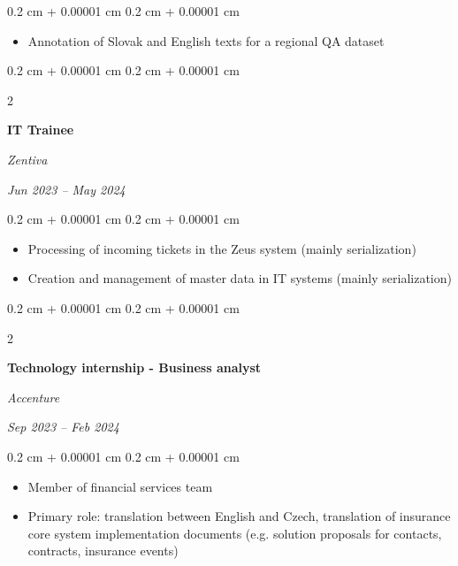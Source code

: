 \documentclass[10pt, letterpaper]{article}
\newenvironment{highlights}{
    \begin{itemize}[
        topsep=0.10 cm,
        parsep=0.10 cm,
        partopsep=0pt,
        itemsep=0pt,
        leftmargin=0.4 cm + 10pt
    ]
}{
    \end{itemize}
} %
\newenvironment{onecolentry}{
    \begin{adjustwidth}{
        0.2 cm + 0.00001 cm
    }{
        0.2 cm + 0.00001 cm
    }
}{
    \end{adjustwidth}
} %
\newenvironment{twocolentry}[2][]{
    \onecolentry
    \def\secondColumn{#2}
    \setcolumnwidth{\fill, 4.5 cm}
    \begin{paracol}{2}
}{
    \switchcolumn \raggedleft \secondColumn
    \end{paracol}
    \endonecolentry
} %
\begin{document}
        \vspace{0.10 cm}
        \begin{onecolentry}
            \begin{highlights}
                \item Annotation of Slovak and English texts for a regional QA dataset

            
            \end{highlights}
        \end{onecolentry}


        \vspace{0.2 cm}
        \begin{twocolentry}{
            
        \textit{Jun 2023 – May 2024}}
            \textbf{IT Trainee}
            
            \textit{Zentiva}
        \end{twocolentry}

        \vspace{0.10 cm}
        \begin{onecolentry}
            \begin{highlights}
                \item Processing of incoming tickets in the Zeus system (mainly serialization)
                \item Creation and management of master data in IT systems (mainly serialization)
            
            \end{highlights}
        \end{onecolentry}


        \vspace{0.2 cm}


        
        \begin{twocolentry}{
            
        \textit{Sep 2023 – Feb 2024}}
            \textbf{Technology internship - Business analyst}
            
            \textit{Accenture}
        \end{twocolentry}

        \vspace{0.10 cm}
        \begin{onecolentry}
            \begin{highlights}
                \item Member of financial services team
                \item Primary role: translation between English and Czech, translation of insurance core system implementation
documents (e.g. solution proposals for contacts, contracts, insurance events)
            \end{highlights}
        \end{onecolentry}
\end{document}
